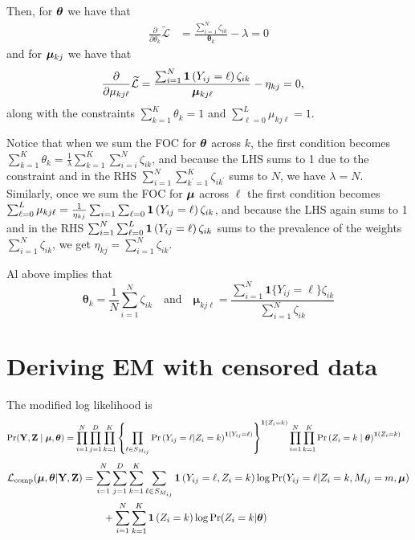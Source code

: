 \documentclass[11pt]{article}
\begin{document}
Then, for \(\bm{\theta}\) we have that
\begin{align*}
\frac{\partial}{\partial {\theta}_{k}}\widetilde{\mathcal{L}}
&= \frac{\sum^{N}_{i=1}\zeta_{ik}}{\bm{\theta}_{k}} - \lambda  = 0
\end{align*}
and for \(\bm{\mu}_{kj}\) we have that
\begin{align*}
\frac{\partial}{\partial {\mu}_{kj\ell}}\widetilde{\mathcal{L}}
&= \frac{\sum^{N}_{i=1}\bm{1}\left(Y_{ij} = \ell\right)\zeta_{ik}}{\bm{\mu}_{kj\ell}} - \eta_{kj}  = 0,
\end{align*}
along with the constraints \(\sum^K_{k=1}\theta_k = 1\) and \(\sum^L_{\ell = 0} \mu_{kj\ell} = 1\).

Notice that when we sum the FOC for \(\bm{\theta}\) across \(k\), the first condition becomes \(\sum^K_{k=1}\theta_k = \frac{1}{\lambda}\sum^K_{k = 1}\sum^N_{i=i}\zeta_{ik}\), and because the LHS sums to 1 due to the constraint and in the RHS  \(\sum^{N}_{i=1}\sum^{K}_{k^\prime =1}\zeta_{ik^\prime}\) sums to \(N\), we have \(\lambda = N\). Similarly, once we sum the FOC for \(\bm{\mu}\) across \(\ell\) the first condition becomes  \(\sum^L_{\ell=0} \mu_{kj\ell} = \frac{1}{\eta_{kj}}\sum_{i=1}\sum_{\ell=0}\bm{1}\left(Y_{ij} = \ell\right)\zeta_{ik}\), and because the LHS again sums to 1 and in the RHS   \(\sum^{N}_{i=1}\sum^{L}_{\ell = 0}\bm{1}\left(Y_{ij} = \ell\right)\zeta_{ik}\) sums to the prevalence of the weights \(\sum^{N}_{i=1}\zeta_{ik}\), we get \(\eta_{kj}= \sum^{N}_{i=1}\zeta_{ik}\).

Al above implies that
\begin{equation}
\bm{\theta}_{k} = \frac{1}{N}\sum^{N}_{i=1}\zeta_{ik}\quad
\text{and}\quad
\bm{\mu}_{kj\ell} =
\frac{\sum^{N}_{i=1}\bm{1}\{Y_{ij} = \ell\}\zeta_{ik}}{\sum^{N}_{i=1}\zeta_{ik}}
\end{equation}


\section{Deriving EM with censored data}

The modified log likelihood is
\begin{align}
\Pr(\mathbf{Y}, \mathbf{Z} \mid \bm{\mu}, \bm{\theta})\nonumber &= \prod^{N}_{i=1}\prod^{D}_{j=1}\prod^{K}_{k=1}\left\{\prod^{}_{\ell\in S_{M_{ij}}}\mathbb{\Pr}\left(Y_{ij} = \ell | Z_i = k\right)^{\bm{1}\left(Y_{ij} = \ell\right)}\right\}^{\bm{1}\left(Z_i=k\right)} \prod^N_{i=1}\prod^K_{k=1}\mathbb{\Pr}\left(Z_i = {k} \mid \bm{\theta}\right)^{\bm{1}\left(Z_i = k\right)}\nonumber
\end{align}
\begin{align}
\mathcal{L}_{\text{comp}}(\bm{\mu}, \bm{\theta}|\mathbf{Y}, \mathbf{Z}) & = \sum^{N}_{i=1}\sum^{D}_{j=1}\sum^{K}_{k=1}\sum^{}_{\ell \in S_{M_{ij}}}
\bm{1}\left(Y_{ij} = \ell, Z_{i} = k\right)
\log \Pr(Y_{ij} = \ell | Z_{i} = k,  M_{ij} = m, \bm{\mu})\nonumber\\
& \qquad +
\sum^N_{i=1}\sum^{K}_{k=1}\bm{1}\left(Z_{i} = k\right)\log \Pr(Z_{i} = k | \bm{\theta})\nonumber
\end{align}
\end{document}
